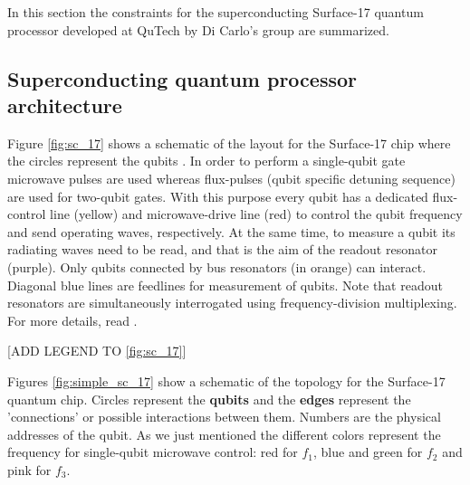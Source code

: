 

In this section the constraints for the superconducting Surface-17 quantum processor developed at QuTech by Di Carlo's group are summarized. 

\subsection{Superconducting quantum processor architecture}
\label{sec:topology}

Figure \ref{fig:sc_17} shows a schematic of the layout for the Surface-17 chip where the circles represent the qubits \cite{versluis2016scalable}.
In order to perform a single-qubit gate microwave pulses are used whereas flux-pulses (qubit specific detuning sequence) are used for two-qubit gates. 
With this purpose every qubit has a dedicated flux-control line (yellow) and microwave-drive line (red) to control the qubit frequency and send operating waves, respectively.
At the same time, to measure a qubit its radiating waves need to be read, and that is the aim of the readout resonator (purple).
Only qubits connected by bus resonators (in orange) can interact.
Diagonal blue lines are feedlines for measurement of qubits.
Note that readout resonators are simultaneously interrogated using frequency-division multiplexing.
For more details, read \cite{versluis2016scalable,versluis2017scalable}.

[ADD LEGEND TO \ref{fig:sc_17}]


Figures \ref{fig:simple_sc_17}  show a schematic of the topology for the Surface-17 quantum chip.
Circles represent the \textbf{qubits}  and the \textbf{edges} represent the 'connections' or possible interactions between them.
Numbers  are the physical addresses of the qubit. As we just mentioned the different colors represent the frequency for single-qubit microwave control: red for $f_1$, blue and green for $f_2$ and pink for $f_3$.


